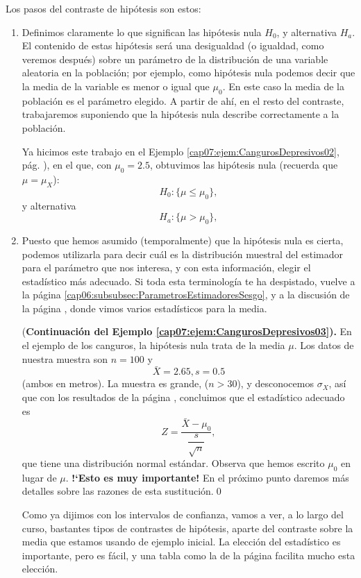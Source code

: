 Los pasos del contraste de hipótesis son estos:
     \begin{enumerate}
     \item Definimos claramente lo que significan las hipótesis nula $H_0$, y alternativa $H_a$. El contenido de estas hipótesis será una desigualdad (o igualdad, como veremos después) sobre un parámetro de la distribución de una variable aleatoria en la población; por ejemplo, como hipótesis nula podemos decir que la media de la variable es menor o igual que $\mu_0$. En este caso la media de la población es el parámetro elegido. A partir de ahí, en el resto del contraste, trabajaremos suponiendo que la hipótesis nula describe correctamente a la población.
        \begin{ejemplo}
            \label{cap07:ejem:CangurosDepresivos03}
            Ya hicimos este trabajo en el Ejemplo \ref{cap07:ejem:CangurosDepresivos02}, pág. \pageref{cap07:ejem:CangurosDepresivos02}), en el que, con $\mu_0=2.5$, obtuvimos las hipótesis nula (recuerda que $\mu=\mu_X$):
            \[H_0: \{\mu\leq \mu_0\},\]
            y alternativa
            \[H_a: \{\mu > \mu_0\},\]
        \end{ejemplo}


     \item  Puesto que hemos asumido (temporalmente) que la hipótesis nula es cierta, podemos utilizarla para decir cuál es la distribución muestral del estimador para el parámetro que nos interesa, y con esta información, elegir el estadístico más adecuado. Si toda esta terminología te ha despistado, vuelve a la página \ref{cap06:subsubsec:ParametrosEstimadoresSesgo}, y a la discusión de la  página \pageref{cap06:lugar:ListaEstadisticosMedia}, donde vimos varios estadísticos para la media.
         \begin{ejemplo}{(\bf Continuación del Ejemplo \ref{cap07:ejem:CangurosDepresivos03}).}
         \label{cap07:ejem:CangurosDepresivos03a}
         En el ejemplo de los canguros, la hipótesis nula trata de la media $\mu$. Los datos de nuestra muestra son $n=100$ y
            \[\bar X=2.65, s=0.5\]
         (ambos en metros). La muestra es grande, ($n>30$), y desconocemos $\sigma_X$, así que con los resultados de la  página \pageref{cap06:lugar:ListaEstadisticosMedia}, concluimos que el estadístico adecuado es
         \[Z=\dfrac{\bar X-\mu_0}{\dfrac{s}{\sqrt{n}}},\]
         que tiene una distribución normal estándar. Observa que hemos escrito $\mu_0$ en lugar de $\mu$. {\bf {!`}Esto es muy importante!} En el próximo punto daremos más detalles sobre las razones de esta sustitución.\qed
         \end{ejemplo}
         Como ya dijimos con los intervalos de confianza, vamos a ver, a lo largo del curso, bastantes tipos de contrastes de hipótesis, aparte del contraste sobre la media que estamos usando de ejemplo inicial. La elección del estadístico es importante, pero es fácil, y una tabla como la de la página \pageref{tabla:EstadisticosContrastes} facilita mucho esta elección.


\end{enumerate}
